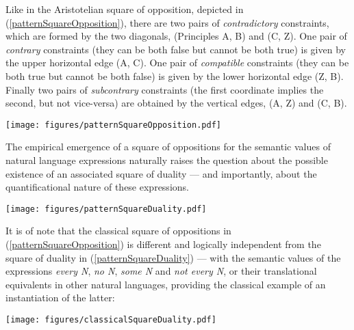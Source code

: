 \documentclass[output=paper
	        ,collection
	        ,collectionchapter
 	        ,biblatex
                ,babelshorthands
                ,newtxmath
                ,draftmode
                ,colorlinks, citecolor=brown
]{langscibook}
\begin{document}

Like in the Aristotelian square of opposition, depicted in (\ref{patternSquareOpposition}), there are two pairs of {\em contradictory} constraints, which are formed
by the two diagonals, (Principles A, B) and (C, Z). One pair of {\em contrary}
constraints (they can be both false but cannot be both true) is given
by the upper horizontal edge (A, C).  One pair of {\em compatible}
constraints (they can be both true but cannot be both false) is given
by the lower horizontal edge (Z, B). Finally two pairs of
{\em subcontrary} constraints (the first coordinate implies the second,
but not vice-versa) are obtained by the vertical edges, (A, Z) and (C,
B).


\begin{exe}
\ex
\label{patternSquareOpposition}
\end{exe}
\vspace{-10mm}
\centerline{\texttt{[image: figures/patternSquareOpposition.pdf]}}



The empirical
emergence of a square of oppositions for the semantic values of natural
language expressions naturally raises the question about the possible
existence of an associated square of duality --- and importantly,
about the quantificational nature of these expressions. 

\pagebreak
{}
\begin{exe}
\ex
\label{patternSquareDuality}
\end{exe}
\vspace{-7mm}
\centerline{\texttt{[image: figures/patternSquareDuality.pdf]}}



It is of note that 
the classical square of oppositions in (\ref{patternSquareOpposition})
is different and logically independent from
the square of duality in (\ref{patternSquareDuality}) --- with the semantic values of the  
expressions {\em every N}, {\em no N},
{\em some N} and {\em not every N}, or their translational equivalents in
other natural languages, providing the classical example of an instantiation
of the latter:

\begin{exe}
\ex
\end{exe}
\vspace{-7mm}
\centerline{\hspace{0 mm}\texttt{[image: figures/classicalSquareDuality.pdf]}}
\end{document}
